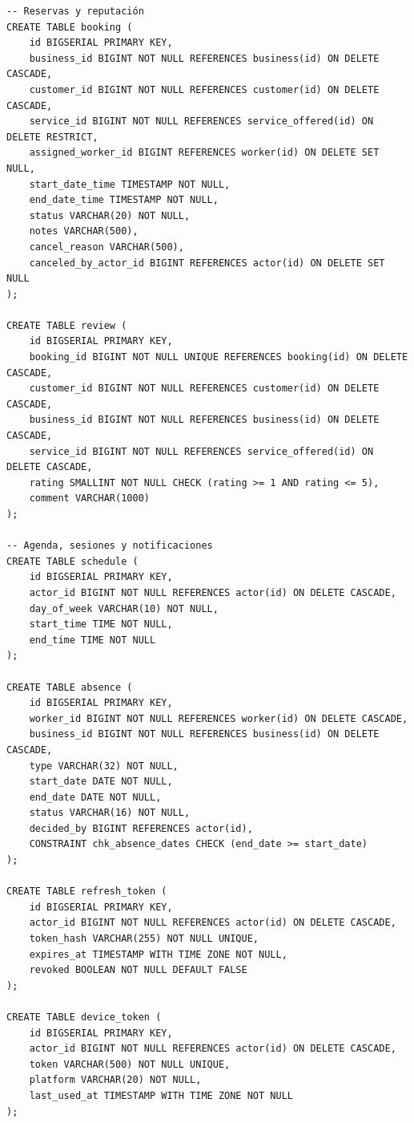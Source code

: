 \documentclass[12pt,a4paper,twoside]{report}
\begin{document}
\begin{lstlisting}[style=sqlStyle, caption={DDL resumido de las migraciones principales (V1--V5)}, label={lst:ddl}]
-- Reservas y reputación
CREATE TABLE booking (
    id BIGSERIAL PRIMARY KEY,
    business_id BIGINT NOT NULL REFERENCES business(id) ON DELETE CASCADE,
    customer_id BIGINT NOT NULL REFERENCES customer(id) ON DELETE CASCADE,
    service_id BIGINT NOT NULL REFERENCES service_offered(id) ON DELETE RESTRICT,
    assigned_worker_id BIGINT REFERENCES worker(id) ON DELETE SET NULL,
    start_date_time TIMESTAMP NOT NULL,
    end_date_time TIMESTAMP NOT NULL,
    status VARCHAR(20) NOT NULL,
    notes VARCHAR(500),
    cancel_reason VARCHAR(500),
    canceled_by_actor_id BIGINT REFERENCES actor(id) ON DELETE SET NULL
);

CREATE TABLE review (
    id BIGSERIAL PRIMARY KEY,
    booking_id BIGINT NOT NULL UNIQUE REFERENCES booking(id) ON DELETE CASCADE,
    customer_id BIGINT NOT NULL REFERENCES customer(id) ON DELETE CASCADE,
    business_id BIGINT NOT NULL REFERENCES business(id) ON DELETE CASCADE,
    service_id BIGINT NOT NULL REFERENCES service_offered(id) ON DELETE CASCADE,
    rating SMALLINT NOT NULL CHECK (rating >= 1 AND rating <= 5),
    comment VARCHAR(1000)
);

-- Agenda, sesiones y notificaciones
CREATE TABLE schedule (
    id BIGSERIAL PRIMARY KEY,
    actor_id BIGINT NOT NULL REFERENCES actor(id) ON DELETE CASCADE,
    day_of_week VARCHAR(10) NOT NULL,
    start_time TIME NOT NULL,
    end_time TIME NOT NULL
);

CREATE TABLE absence (
    id BIGSERIAL PRIMARY KEY,
    worker_id BIGINT NOT NULL REFERENCES worker(id) ON DELETE CASCADE,
    business_id BIGINT NOT NULL REFERENCES business(id) ON DELETE CASCADE,
    type VARCHAR(32) NOT NULL,
    start_date DATE NOT NULL,
    end_date DATE NOT NULL,
    status VARCHAR(16) NOT NULL,
    decided_by BIGINT REFERENCES actor(id),
    CONSTRAINT chk_absence_dates CHECK (end_date >= start_date)
);

CREATE TABLE refresh_token (
    id BIGSERIAL PRIMARY KEY,
    actor_id BIGINT NOT NULL REFERENCES actor(id) ON DELETE CASCADE,
    token_hash VARCHAR(255) NOT NULL UNIQUE,
    expires_at TIMESTAMP WITH TIME ZONE NOT NULL,
    revoked BOOLEAN NOT NULL DEFAULT FALSE
);

CREATE TABLE device_token (
    id BIGSERIAL PRIMARY KEY,
    actor_id BIGINT NOT NULL REFERENCES actor(id) ON DELETE CASCADE,
    token VARCHAR(500) NOT NULL UNIQUE,
    platform VARCHAR(20) NOT NULL,
    last_used_at TIMESTAMP WITH TIME ZONE NOT NULL
);
\end{lstlisting}
\end{document}
